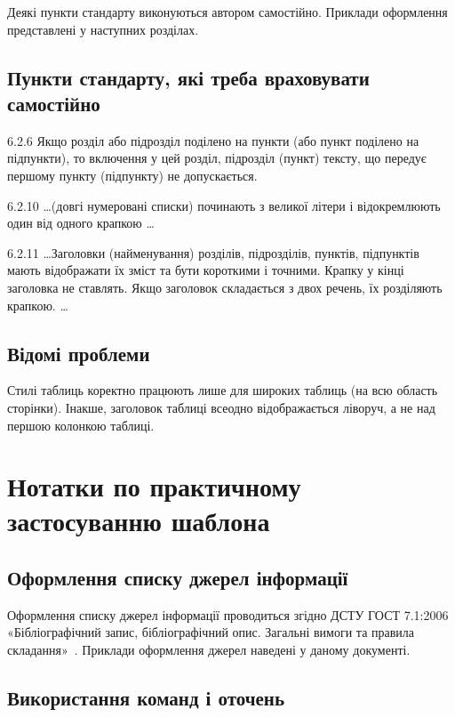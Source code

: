 Деякі пункти стандарту виконуються автором самостійно. Приклади оформлення представлені у наступних розділах.

\subsection{Пункти стандарту, які треба враховувати самостійно}

6.2.6 Якщо розділ або підрозділ поділено на пункти (або пункт поділено на підпункти), то включення у цей розділ, підрозділ (пункт) тексту, що передує першому пункту (підпункту) не допускається.

6.2.10 \dots (довгі нумеровані списки) починають з великої літери і відокремлюють один від одного крапкою \dots

6.2.11 \dots Заголовки (найменування) розділів, підрозділів, пунктів, підпунктів мають відображати їх зміст та бути короткими і точними. Крапку у кінці заголовка не ставлять. Якщо заголовок складається з двох речень, їх розділяють крапкою. \dots

\subsection{Відомі проблеми}

\begin{longEnumerate}
\item Стилі таблиць коректно працюють лише для широких таблиць (на всю область сторінки). Інакше, заголовок таблиці всеодно відображається ліворуч, а не над першою колонкою таблиці.
\end{longEnumerate}

\section{Нотатки по практичному застосуванню шаблона}
\subsection{Оформлення списку джерел інформації}

Оформлення списку джерел інформації проводиться згідно ДСТУ ГОСТ 7.1:2006
«Бібліографічний запис, бібліографічний опис. Загальні вимоги та правила
складання»~\cite{DSTU_GOST_7.1_2006}. Приклади оформлення джерел наведені у
даному документі.

\subsection{Використання команд і оточень}
